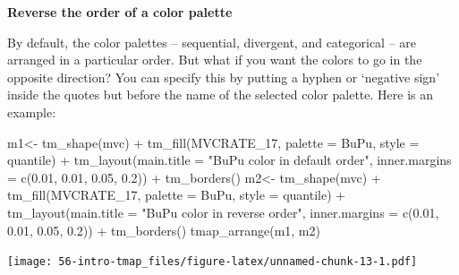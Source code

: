 \documentclass[
]{book}
\newenvironment{Shaded}{\begin{snugshade}}{\end{snugshade}}
\newcommand{\AttributeTok}[1]{\textcolor[rgb]{0.77,0.63,0.00}{#1}}
\newcommand{\FloatTok}[1]{\textcolor[rgb]{0.00,0.00,0.81}{#1}}
\newcommand{\FunctionTok}[1]{\textcolor[rgb]{0.00,0.00,0.00}{#1}}
\newcommand{\NormalTok}[1]{#1}
\newcommand{\OtherTok}[1]{\textcolor[rgb]{0.56,0.35,0.01}{#1}}
\newcommand{\SpecialCharTok}[1]{\textcolor[rgb]{0.00,0.00,0.00}{#1}}
\newcommand{\StringTok}[1]{\textcolor[rgb]{0.31,0.60,0.02}{#1}}
\newenvironment{rmdtip}[1]
  {
  \begin{itemize}
  \renewcommand{\labelitemi}{
    \raisebox{-.7\height}[0pt][0pt]{
      {\setkeys{Gin}{width=3em,keepaspectratio}\texttt{[image: images/\#1]}}
    }
  }
  \setlength{\fboxsep}{1em}
  \begin{tip}
  \item
  }
  {
  \end{tip}
  \end{itemize}
  }
\begin{document}
\begin{rmdtip}{tip}
\textbf{Reverse the order of a color palette}

By default, the color palettes -- sequential, divergent, and categorical -- are arranged in a particular order. But what if you want the colors to go in the opposite direction? You can specify this by putting a hyphen or `negative sign' inside the quotes but before the name of the selected color palette. Here is an example:

\begin{Shaded}
\begin{Highlighting}[]
\NormalTok{m1}\OtherTok{\textless{}{-}} \FunctionTok{tm\_shape}\NormalTok{(mvc) }\SpecialCharTok{+}
  \FunctionTok{tm\_fill}\NormalTok{(}\StringTok{\textquotesingle{}MVCRATE\_17\textquotesingle{}}\NormalTok{,}
          \AttributeTok{palette =} \StringTok{\textquotesingle{}BuPu\textquotesingle{}}\NormalTok{,}
          \AttributeTok{style =} \StringTok{\textquotesingle{}quantile\textquotesingle{}}\NormalTok{) }\SpecialCharTok{+}
  \FunctionTok{tm\_layout}\NormalTok{(}\AttributeTok{main.title =} \StringTok{"BuPu color in default order"}\NormalTok{,}
            \AttributeTok{inner.margins =} \FunctionTok{c}\NormalTok{(}\FloatTok{0.01}\NormalTok{, }\FloatTok{0.01}\NormalTok{, }\FloatTok{0.05}\NormalTok{, }\FloatTok{0.2}\NormalTok{)) }\SpecialCharTok{+}
  \FunctionTok{tm\_borders}\NormalTok{()}
\NormalTok{m2}\OtherTok{\textless{}{-}} \FunctionTok{tm\_shape}\NormalTok{(mvc) }\SpecialCharTok{+}
  \FunctionTok{tm\_fill}\NormalTok{(}\StringTok{\textquotesingle{}MVCRATE\_17\textquotesingle{}}\NormalTok{,}
          \AttributeTok{palette =} \StringTok{\textquotesingle{}{-}BuPu\textquotesingle{}}\NormalTok{,}
          \AttributeTok{style =} \StringTok{\textquotesingle{}quantile\textquotesingle{}}\NormalTok{) }\SpecialCharTok{+}
  \FunctionTok{tm\_layout}\NormalTok{(}\AttributeTok{main.title =} \StringTok{"BuPu color in reverse order"}\NormalTok{,}
            \AttributeTok{inner.margins =} \FunctionTok{c}\NormalTok{(}\FloatTok{0.01}\NormalTok{, }\FloatTok{0.01}\NormalTok{, }\FloatTok{0.05}\NormalTok{, }\FloatTok{0.2}\NormalTok{)) }\SpecialCharTok{+}
  \FunctionTok{tm\_borders}\NormalTok{()}
\FunctionTok{tmap\_arrange}\NormalTok{(m1, m2)}
\end{Highlighting}
\end{Shaded}

\texttt{[image: 56-intro-tmap\_files/figure-latex/unnamed-chunk-13-1.pdf]}

\end{rmdtip}
\end{document}
